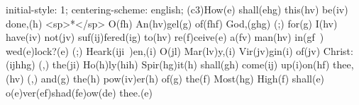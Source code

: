 initial-style: 1;
centering-scheme: english;
(c3)How(e) shall(ehg) this(hv) be(iv) done,(h) <sp>*</sp> O(fh) An(hv)gel(g) of(fhf) God,(ghg) (;) for(g) I(hv) have(iv) not(jv) suf(ij)fered(ig) to(hv) re(f)ceive(e) a(fv) man(hv) in(gf~) wed(e)lock?(e) (;) Heark(iji~)en,(i) O(jl) Mar(lv)y,(i) Vir(jv)gin(i) of(jv) Christ:(ijhhg) (,) the(ji) Ho(h)ly(hih) Spir(hg)it(h) shall(gh) come(ij) up(i)on(hf) thee,(hv) (,) and(g) the(h) pow(iv)er(h) of(g) the(f) Most(hg) High(f) shall(e) o(e)ver(ef)shad(fe)ow(de) thee.(e)
